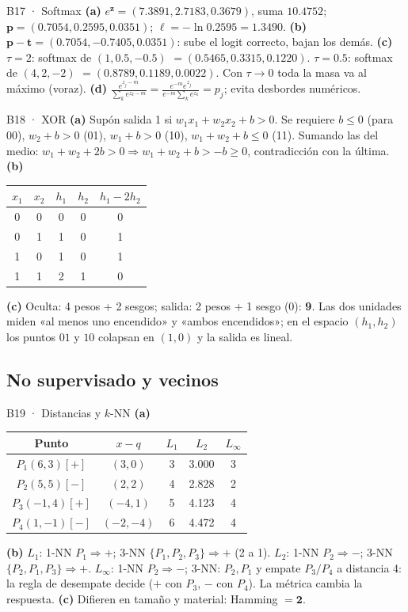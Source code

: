 \begin{solucion}{B17 · Softmax}
\textbf{(a)} $e^{\mathbf z}=(7.3891,2.7183,0.3679)$, suma $10.4752$; $\mathbf p=(0.7054,0.2595,0.0351)$; $\ell=-\ln0.2595=\mathbf{1.3490}$.
\textbf{(b)} $\mathbf p-\mathbf t=(0.7054,-0.7405,0.0351)$: sube el logit correcto, bajan los demás.
\textbf{(c)} $\tau=2$: softmax de $(1,0.5,-0.5)$ $=(0.5465,0.3315,0.1220)$. $\tau=0.5$: softmax de $(4,2,-2)$ $=(0.8789,0.1189,0.0022)$.
Con $\tau\to0$ toda la masa va al máximo (voraz).
\textbf{(d)} $\frac{e^{z_j-m}}{\sum_ke^{z_k-m}}=\frac{e^{-m}e^{z_j}}{e^{-m}\sum_ke^{z_k}}=p_j$; evita desbordes numéricos.
\end{solucion}

\begin{solucion}{B18 · XOR}
\textbf{(a)} Supón salida 1 si $w_1x_1+w_2x_2+b>0$. Se requiere $b\le0$ (para $00$), $w_2+b>0$ (01), $w_1+b>0$ (10), $w_1+w_2+b\le0$ (11).
Sumando las del medio: $w_1+w_2+2b>0\Rightarrow w_1+w_2+b>-b\ge0$, contradicción con la última.
\textbf{(b)}
\begin{center}\small
\begin{tabular}{cc|cc|c}
$x_1$&$x_2$&$h_1$&$h_2$&$h_1-2h_2$\\\hline
0&0&0&0&0\\0&1&1&0&1\\1&0&1&0&1\\1&1&2&1&0
\end{tabular}
\end{center}
\textbf{(c)} Oculta: 4 pesos + 2 sesgos; salida: 2 pesos + 1 sesgo (0): \textbf{9}. Las dos unidades miden «al menos uno encendido» y
«ambos encendidos»; en el espacio $(h_1,h_2)$ los puntos $01$ y $10$ colapsan en $(1,0)$ y la salida es lineal.
\end{solucion}

\subsection{No supervisado y vecinos}

\begin{solucion}{B19 · Distancias y $k$-NN}
\textbf{(a)}
\begin{center}\small
\begin{tabular}{c|c|ccc}
Punto & $x-q$ & $L_1$ & $L_2$ & $L_\infty$\\\hline
$P_1(6,3)[+]$ & $(3,0)$ & 3 & 3.000 & 3\\
$P_2(5,5)[-]$ & $(2,2)$ & 4 & 2.828 & 2\\
$P_3(-1,4)[+]$ & $(-4,1)$ & 5 & 4.123 & 4\\
$P_4(1,-1)[-]$ & $(-2,-4)$ & 6 & 4.472 & 4
\end{tabular}
\end{center}
\textbf{(b)} $L_1$: 1-NN $P_1\Rightarrow\mathbf{+}$; 3-NN $\{P_1,P_2,P_3\}\Rightarrow\mathbf{+}$ (2 a 1).
$L_2$: 1-NN $P_2\Rightarrow\mathbf{-}$; 3-NN $\{P_2,P_1,P_3\}\Rightarrow\mathbf{+}$.
$L_\infty$: 1-NN $P_2\Rightarrow\mathbf{-}$; 3-NN: $P_2,P_1$ y empate $P_3/P_4$ a distancia 4: la regla de desempate decide ($+$ con $P_3$, $-$ con $P_4$).
La métrica cambia la respuesta.
\textbf{(c)} Difieren en tamaño y material: Hamming $=\mathbf2$.
\end{solucion}


